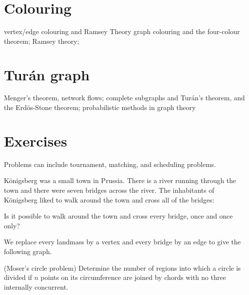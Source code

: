 \section{Colouring}
vertex/edge colouring and Ramsey Theory
graph colouring and the four-colour theorem; Ramsey theory; 

\section{Tur\'{a}n graph}


Menger's theorem, network flows; complete subgraphs and Turán's theorem, and the Erdös-Stone theorem; probabilistic methods in graph theory
\pagebreak

\section*{Exercises}
Problems can include tournament, matching, and scheduling problems.
\begin{exercise}
K\"{o}nigsberg was a small town in Prussia. There is a river running through the town and there were seven bridges across the river. The inhabitants of K\"{o}nigsberg liked to walk around the town and cross all of the bridges:

Is it possible to walk around the town and cross every bridge, once and once only?
\end{exercise}

\begin{solution}
We replace every landmass by a vertex and every bridge by an edge to give the following graph.
\end{solution}

\begin{exercise}(Moser's circle problem) 
Determine the number of regions into which a circle is divided if $n$ points on its circumference are joined by chords with no three internally concurrent.
\end{exercise}

